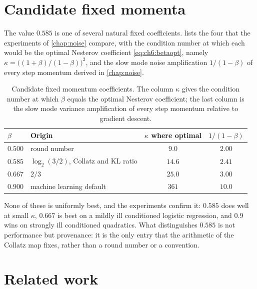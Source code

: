 \section{Candidate fixed momenta}\label{sec:ch6:candidates}

The value $0.585$ is one of several natural fixed coefficients.
 lists the four that the experiments of
\cref{chap:noise} compare, with the condition number at which each would be the
optimal Nesterov coefficient \eqref{eq:ch6:betaopt}, namely
$\kappa=\bigl((1+\beta)/(1-\beta)\bigr)^2$, and the slow mode noise amplification
$1/(1-\beta)$ of every step momentum derived in \cref{chap:noise}.

\begin{table}[t]
\centering
\caption{Candidate fixed momentum coefficients. The column $\kappa$ gives the
condition number at which $\beta$ equals the optimal Nesterov coefficient; the
last column is the slow mode variance amplification of every step momentum
relative to gradient descent.}
\label{tab:ch6:candidates}
\small\setlength{\tabcolsep}{4pt}
\begin{tabular}{llcc}
\toprule
$\beta$ & Origin & $\kappa$ where optimal & $1/(1-\beta)$\\
\midrule
$0.500$ & round number & $9.0$ & $2.00$\\
$0.585$ & $\log_2(3/2)$, Collatz and KL ratio & $14.6$ & $2.41$\\
$0.667$ & $2/3$ & $25.0$ & $3.00$\\
$0.900$ & machine learning default~\cite{kingma2015} & $361$ & $10.0$\\
\bottomrule
\end{tabular}
\end{table}

None of these is uniformly best, and the experiments confirm it: $0.585$ does
well at small $\kappa$, $0.667$ is best on a mildly ill conditioned logistic
regression, and $0.9$ wins on strongly ill conditioned quadratics.
What distinguishes $0.585$ is not performance but provenance: it is the only entry that the arithmetic of the Collatz map fixes, rather than a round number or a convention.

\section{Related work}\label{sec:ch6:related}

